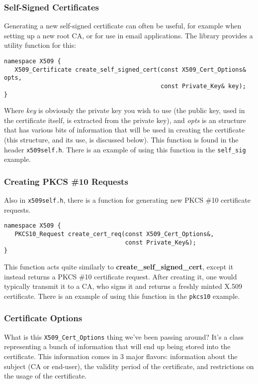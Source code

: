 \documentclass{article}
\newcommand{\filename}[1]{\texttt{#1}}
\newcommand{\function}[1]{\textbf{#1}}
\newcommand{\type}[1]{\texttt{#1}}
\renewcommand{\arg}[1]{\textsl{#1}}
\begin{document}
\subsubsection{Self-Signed Certificates}

Generating a new self-signed certificate can often be useful, for
example when setting up a new root CA, or for use in email
applications. The library provides a utility function for this:

\begin{verbatim}
namespace X509 {
   X509_Certificate create_self_signed_cert(const X509_Cert_Options& opts,
                                            const Private_Key& key);
}
\end{verbatim}

Where \arg{key} is obviously the private key you wish to use (the public key,
used in the certificate itself, is extracted from the private key), and
\arg{opts} is an structure that has various bits of information that will be
used in creating the certificate (this structure, and its use, is discussed
below). This function is found in the header \filename{x509self.h}. There is an
example of using this function in the \filename{self\_sig} example.

\subsubsection{Creating PKCS \#10 Requests}

Also in \filename{x509self.h}, there is a function for generating new PKCS \#10
certificate requests.

\begin{verbatim}
namespace X509 {
   PKCS10_Request create_cert_req(const X509_Cert_Options&,
                                  const Private_Key&);
}
\end{verbatim}

This function acts quite similarly to \function{create\_self\_signed\_cert},
except it instead returns a PKCS \#10 certificate request. After creating it,
one would typically transmit it to a CA, who signs it and returns a freshly
minted X.509 certificate. There is an example of using this function in the
\filename{pkcs10} example.

\subsubsection{Certificate Options}

What is this \type{X509\_Cert\_Options} thing we've been passing
around? It's a class representing a bunch of information that will end
up being stored into the certificate. This information comes in 3
major flavors: information about the subject (CA or end-user), the
validity period of the certificate, and restrictions on the usage of
the certificate.
\end{document}
